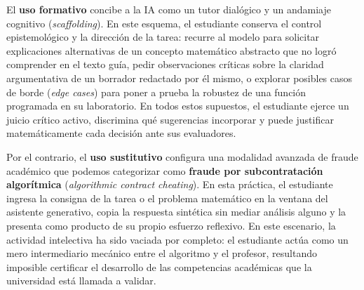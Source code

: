 El \textbf{uso formativo} concibe a la IA como un tutor dialógico y un andamiaje cognitivo (\textit{scaffolding}). En este esquema, el estudiante conserva el control epistemológico y la dirección de la tarea: recurre al modelo para solicitar explicaciones alternativas de un concepto matemático abstracto que no logró comprender en el texto guía, pedir observaciones críticas sobre la claridad argumentativa de un borrador redactado por él mismo, o explorar posibles casos de borde (\textit{edge cases}) para poner a prueba la robustez de una función programada en su laboratorio. En todos estos supuestos, el estudiante ejerce un juicio crítico activo, discrimina qué sugerencias incorporar y puede justificar matemáticamente cada decisión ante sus evaluadores.

Por el contrario, el \textbf{uso sustitutivo} configura una modalidad avanzada de fraude académico que podemos categorizar como \textbf{fraude por subcontratación algorítmica} (\textit{algorithmic contract cheating}). En esta práctica, el estudiante ingresa la consigna de la tarea o el problema matemático en la ventana del asistente generativo, copia la respuesta sintética sin mediar análisis alguno y la presenta como producto de su propio esfuerzo reflexivo. En este escenario, la actividad intelectiva ha sido vaciada por completo: el estudiante actúa como un mero intermediario mecánico entre el algoritmo y el profesor, resultando imposible certificar el desarrollo de las competencias académicas que la universidad está llamada a validar.

